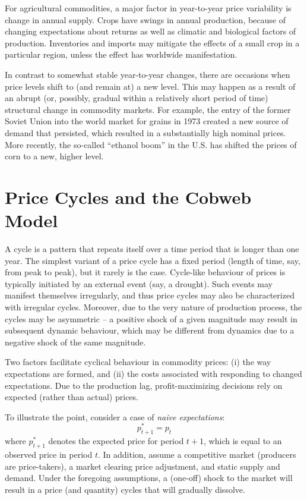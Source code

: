 \documentclass[
]{book}
\begin{document}
For agricultural commodities, a major factor in year-to-year price variability is change in annual supply. Crops have swings in annual production, because of changing expectations about returns as well as climatic and biological factors of production. Inventories and imports may mitigate the effects of a small crop in a particular region, unless the effect has worldwide manifestation.

In contrast to somewhat stable year-to-year changes, there are occasions when price levels shift to (and remain at) a new level. This may happen as a result of an abrupt (or, possibly, gradual within a relatively short period of time) structural change in commodity markets. For example, the entry of the former Soviet Union into the world market for grains in 1973 created a new source of demand that persisted, which resulted in a substantially high nominal prices. More recently, the so-called ``ethanol boom'' in the U.S. has shifted the prices of corn to a new, higher level.

\hypertarget{price-cycles-and-the-cobweb-model}{%
\section{Price Cycles and the Cobweb Model}\label{price-cycles-and-the-cobweb-model}}

A cycle is a pattern that repeats itself over a time period that is longer than one year. The simplest variant of a price cycle has a fixed period (length of time, say, from peak to peak), but it rarely is the case. Cycle-like behaviour of prices is typically initiated by an external event (say, a drought). Such events may manifest themselves irregularly, and thus price cycles may also be characterized with irregular cycles. Moreover, due to the very nature of production process, the cycles may be asymmetric -- a positive shock of a given magnitude may result in subsequent dynamic behaviour, which may be different from dynamics due to a negative shock of the same magnitude.

Two factors facilitate cyclical behaviour in commodity prices: (i) the way expectations are formed, and (ii) the costs associated with responding to changed expectations. Due to the production lag, profit-maximizing decisions rely on expected (rather than actual) prices.

To illustrate the point, consider a case of \emph{naive expectations}: \[p_{t+1}^{*} = p_{t}\] where \(p_{t+1}^{*}\) denotes the expected price for period \(t+1\), which is equal to an observed price in period \(t\). In addition, assume a competitive market (producers are price-takers), a market clearing price adjustment, and static supply and demand. Under the foregoing assumptions, a (one-off) shock to the market will result in a price (and quantity) cycles that will gradually dissolve.
\end{document}
